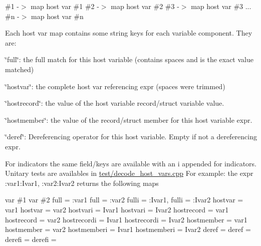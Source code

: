 \#1 -\/$>$ map host var \#1 \#2 -\/$>$ map host var \#2 \#3 -\/$>$ map host var \#3 ... \#n -\/$>$ map host var \#n

Each host var map contains some string keys for each variable component. They are\+:
\begin{DoxyItemize}
\item \char`\"{}full\char`\"{}\+: the full match for this host variable (contains spaces and is the exact value matched)
\item \char`\"{}hostvar\char`\"{}\+: the complete host var referencing expr (spaces were trimmed)
\item \char`\"{}hostrecord\char`\"{}\+: the value of the host variable record/struct variable value.
\item \char`\"{}hostmember\char`\"{}\+: the value of the record/struct member for this host variable expr.
\item \char`\"{}deref\char`\"{}\+: Dereferencing operator for this host variable. Empty if not a dereferencing expr.
\end{DoxyItemize}

For indicators the same field/keys are available with an \textquotesingle{}i\textquotesingle{} appended for \textquotesingle{}indicators\textquotesingle{}. Unitary tests are availables in \hyperlink{decode__host__vars_8cpp}{test/decode\+\_\+host\+\_\+vars.\+cpp} For example\+: the expr \textquotesingle{}\+:var1\+:Ivar1, \+:var2\+:Ivar2\textquotesingle{} returns the following maps

var \#1 var \#2 full = \textquotesingle{}\+:var1\textquotesingle{} full = \textquotesingle{}\+:var2\textquotesingle{} fulli = \textquotesingle{}\+:Ivar1, \textquotesingle{} fulli = \textquotesingle{}\+:Ivar2\textquotesingle{} hostvar = \textquotesingle{}var1\textquotesingle{} hostvar = \textquotesingle{}var2\textquotesingle{} hostvari = \textquotesingle{}Ivar1\textquotesingle{} hostvari = \textquotesingle{}Ivar2\textquotesingle{} hostrecord = \textquotesingle{}var1\textquotesingle{} hostrecord = \textquotesingle{}var2\textquotesingle{} hostrecordi = \textquotesingle{}Ivar1\textquotesingle{} hostrecordi = \textquotesingle{}Ivar2\textquotesingle{} hostmember = \textquotesingle{}var1\textquotesingle{} hostmember = \textquotesingle{}var2\textquotesingle{} hostmemberi = \textquotesingle{}Ivar1\textquotesingle{} hostmemberi = \textquotesingle{}Ivar2\textquotesingle{} deref = \textquotesingle{}\textquotesingle{} deref = \textquotesingle{}\textquotesingle{} derefi = \textquotesingle{}\textquotesingle{} derefi = \textquotesingle{}\textquotesingle{}


